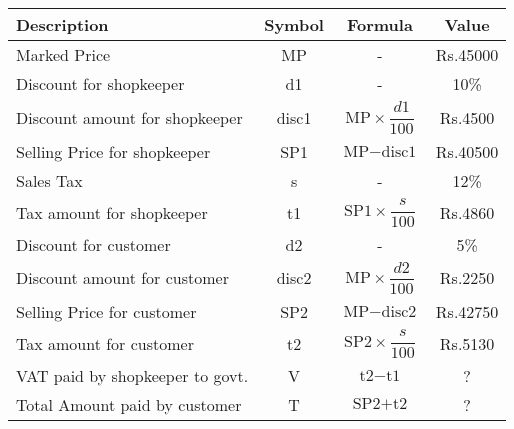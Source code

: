 \begin{tabular}{|p{3.5cm}|c|c|c|}
       \hline
     \textbf{Description}  & \textbf{Symbol} &  \textbf{Formula}  &  \textbf{Value} \\
       \hline
       \hline
       Marked Price & MP & - & Rs.45000 \\  
       \hline
       Discount for shopkeeper & d1 & - & 10\% \\
       \hline
       Discount amount for shopkeeper & disc1 & $\text{MP}\times\dfrac{d1}{100}$ & Rs.4500\\
       \hline
       Selling Price for shopkeeper & SP1 & $\text{MP} -  \text{disc1}$ & Rs.40500 \\
       \hline
       Sales Tax & s & - & 12\% \\
       \hline
       Tax amount for shopkeeper & t1 & $\text{SP1}\times\dfrac{s}{100}$ & Rs.4860\\
       \hline
       Discount for customer & d2 & - & 5\% \\
       \hline
       Discount amount for customer & disc2 & $\text{MP}\times\dfrac{d2}{100}$ & Rs.2250 \\
       \hline
       Selling Price for customer & SP2 & $\text{MP} - \text{disc2}$ & Rs.42750 \\
       \hline
       Tax amount for customer & t2 & $\text{SP2}\times\dfrac{s}{100}$ & Rs.5130\\
       \hline
       VAT paid by shopkeeper to govt. & V & $\text{t2} - \text{t1}$ & ?\\
       \hline
       Total Amount paid by customer & T & $\text{SP2} + \text{t2}$ & ?\\
       \hline
       
    \end{tabular}
